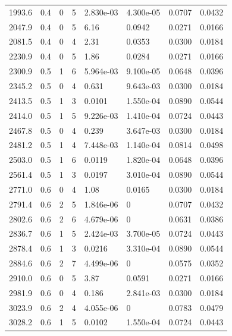 \documentclass[preview]{standalone}
\begin{document}
{{{\begin{tabular}{L{1.2cm}C{1.2cm} C{0.3cm}C{0.5cm} C{1.4cm}C{1.4cm} C{1.4cm}C{1.4cm}}
  1993.6  &   0.4  & 0     &  5 &  2.830e-03  & 4.300e-05  & 0.0707 &  0.0432   \\ 
  2047.9  &   0.4  & 0     &  5 &  6.16  & 0.0942  & 0.0271 &  0.0166   \\ 
  2081.5  &   0.4  & 0     &  4 &  2.31  & 0.0353  & 0.0300 &  0.0184   \\ 
  2230.9  &   0.4  & 0     &  5 &  1.86  & 0.0284  & 0.0271 &  0.0166   \\ 
  2300.9  &   0.5  & 1     &  6 &  5.964e-03  & 9.100e-05  & 0.0648 &  0.0396   \\ 
  2345.2  &   0.5  & 0     &  4 &  0.631  & 9.643e-03  & 0.0300 &  0.0184   \\ 
  2413.5  &   0.5  & 1     &  3 &  0.0101  & 1.550e-04  & 0.0890 &  0.0544   \\ 
  2414.0  &   0.5  & 1     &  5 &  9.226e-03  & 1.410e-04  & 0.0724 &  0.0443   \\ 
  2467.8  &   0.5  & 0     &  4 &  0.239  & 3.647e-03  & 0.0300 &  0.0184   \\ 
  2481.2  &   0.5  & 1     &  4 &  7.448e-03  & 1.140e-04  & 0.0814 &  0.0498   \\ 
  2503.0  &   0.5  & 1     &  6 &  0.0119  & 1.820e-04  & 0.0648 &  0.0396   \\ 
  2561.4  &   0.5  & 1     &  3 &  0.0197  & 3.010e-04  & 0.0890 &  0.0544   \\ 
  2771.0  &   0.6  & 0     &  4 &  1.08  & 0.0165  & 0.0300 &  0.0184   \\ 
  2791.4  &   0.6  & 2     &  5 &  1.846e-06  & 0  & 0.0707 &  0.0432   \\ 
  2802.6  &   0.6  & 2     &  6 &  4.679e-06  & 0  & 0.0631 &  0.0386   \\ 
  2836.7  &   0.6  & 1     &  5 &  2.424e-03  & 3.700e-05  & 0.0724 &  0.0443   \\ 
  2878.4  &   0.6  & 1     &  3 &  0.0216  & 3.310e-04  & 0.0890 &  0.0544   \\ 
  2884.6  &   0.6  & 2     &  7 &  4.499e-06  & 0  & 0.0575 &  0.0352   \\ 
  2910.0  &   0.6  & 0     &  5 &  3.87  & 0.0591  & 0.0271 &  0.0166   \\ 
  2981.9  &   0.6  & 0     &  4 &  0.186  & 2.841e-03  & 0.0300 &  0.0184   \\ 
  3023.9  &   0.6  & 2     &  4 &  4.055e-06  & 0  & 0.0783 &  0.0479   \\ 
  3028.2  &   0.6  & 1     &  5 &  0.0102  & 1.550e-04  & 0.0724 &  0.0443   \\ 

\end{tabular}}}}
\end{document}
